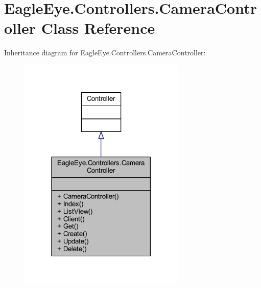 \hypertarget{class_eagle_eye_1_1_controllers_1_1_camera_controller}{}\section{Eagle\+Eye.\+Controllers.\+Camera\+Controller Class Reference}
\label{class_eagle_eye_1_1_controllers_1_1_camera_controller}


Inheritance diagram for Eagle\+Eye.\+Controllers.\+Camera\+Controller\+:\nopagebreak
\begin{figure}[H]
\begin{center}
\leavevmode
\includegraphics[width=225pt]{class_eagle_eye_1_1_controllers_1_1_camera_controller__inherit__graph}
\end{center}
\end{figure}


